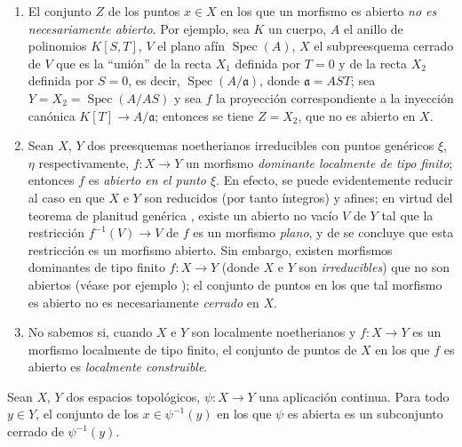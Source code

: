\begin{remarks}[14.1.3]
\label{IV.14.1.3}
\begin{enumerate}[label=(\roman*)]
  \item El conjunto $Z$ de los puntos $x\in X$ en los que un morfismo es abierto \emph{no es necesariamente abierto}.
  Por ejemplo, sea $K$ un cuerpo, $A$ el anillo de polinomios $K[S,T]$, $V$ el plano afín $\operatorname{Spec}(A)$, $X$ el subpreesquema cerrado de $V$ que es la ``unión'' de la recta $X_1$ definida por $T=0$ y de la recta $X_2$ definida por $S=0$, es decir, $\operatorname{Spec}(A/\mathfrak a)$, donde $\mathfrak a=AST$; sea $Y=X_2=\operatorname{Spec}(A/AS)$ y sea $f$ la proyección correspondiente a la inyección canónica $K[T]\to A/\mathfrak a$; entonces se tiene $Z=X_2$, que no es abierto en $X$.

  \item Sean $X$, $Y$ dos preesquemas noetherianos irreducibles con puntos genéricos $\xi$, $\eta$ respectivamente, $f:X\to Y$ un morfismo \emph{dominante localmente de tipo finito}; entonces $f$ es \emph{abierto en el punto $\xi$}.
  En efecto, se puede evidentemente reducir al caso en que $X$ e $Y$ son reducidos (por tanto íntegros)  y afines; en virtud del teorema de planitud genérica , existe un abierto no vacío $V$ de $Y$ tal que la restricción $f^{-1}(V)\to V$ de $f$ es un morfismo \emph{plano}, y de  se concluye que esta restricción es un morfismo abierto.
  Sin embargo, existen morfismos dominantes de tipo finito $f:X\to Y$ (donde $X$ e $Y$ son \emph{irreducibles}) que no son abiertos (véase por ejemplo ); el conjunto de puntos en los que tal morfismo es abierto no es necesariamente \emph{cerrado} en $X$.

  \item No sabemos si, cuando $X$ e $Y$ son localmente noetherianos y $f:X\to Y$ es un morfismo localmente de tipo finito, el conjunto de puntos de $X$ en los que $f$ es abierto es \emph{localmente construible}.
\end{enumerate}
\end{remarks}

\begin{proposition}[14.1.4]
\label{IV.14.1.4}
Sean $X$, $Y$ dos espacios topológicos, $\psi:X\to Y$ una aplicación continua.
Para todo $y\in Y$, el conjunto de los $x\in\psi^{-1}(y)$ en los que $\psi$ es abierta es un subconjunto cerrado de $\psi^{-1}(y)$.
\end{proposition}


